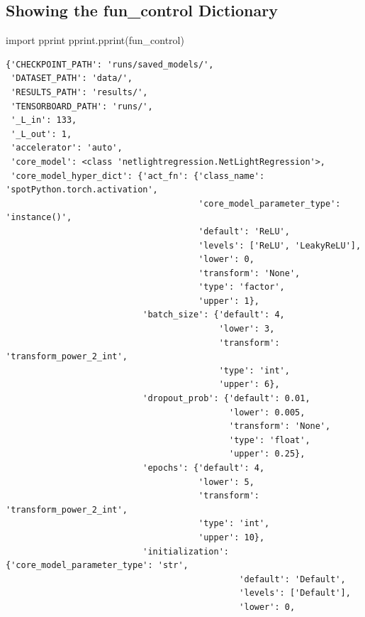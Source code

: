 \documentclass[
  letterpaper,
  DIV=11,
  numbers=noendperiod]{scrreprt}
\newenvironment{Shaded}{\begin{snugshade}}{\end{snugshade}}
\newcommand{\ImportTok}[1]{\textcolor[rgb]{0.00,0.46,0.62}{#1}}
\newcommand{\NormalTok}[1]{\textcolor[rgb]{0.00,0.23,0.31}{#1}}
\begin{document}
\subsection{Showing the fun\_control
Dictionary}\label{sec-show-fun-control-33}

\begin{Shaded}
\begin{Highlighting}[]
\ImportTok{import}\NormalTok{ pprint}
\NormalTok{pprint.pprint(fun\_control)}
\end{Highlighting}
\end{Shaded}

\begin{verbatim}
{'CHECKPOINT_PATH': 'runs/saved_models/',
 'DATASET_PATH': 'data/',
 'RESULTS_PATH': 'results/',
 'TENSORBOARD_PATH': 'runs/',
 '_L_in': 133,
 '_L_out': 1,
 'accelerator': 'auto',
 'core_model': <class 'netlightregression.NetLightRegression'>,
 'core_model_hyper_dict': {'act_fn': {'class_name': 'spotPython.torch.activation',
                                      'core_model_parameter_type': 'instance()',
                                      'default': 'ReLU',
                                      'levels': ['ReLU', 'LeakyReLU'],
                                      'lower': 0,
                                      'transform': 'None',
                                      'type': 'factor',
                                      'upper': 1},
                           'batch_size': {'default': 4,
                                          'lower': 3,
                                          'transform': 'transform_power_2_int',
                                          'type': 'int',
                                          'upper': 6},
                           'dropout_prob': {'default': 0.01,
                                            'lower': 0.005,
                                            'transform': 'None',
                                            'type': 'float',
                                            'upper': 0.25},
                           'epochs': {'default': 4,
                                      'lower': 5,
                                      'transform': 'transform_power_2_int',
                                      'type': 'int',
                                      'upper': 10},
                           'initialization': {'core_model_parameter_type': 'str',
                                              'default': 'Default',
                                              'levels': ['Default'],
                                              'lower': 0,

\end{verbatim}
\end{document}
